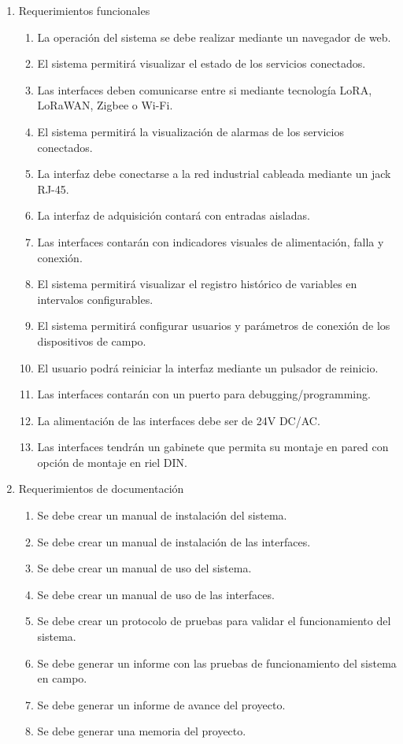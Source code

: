 \documentclass[
11pt%
]{charter}
\begin{document}
\begin{enumerate}
	\item Requerimientos funcionales
		\begin{enumerate}
			\item La operación del sistema se debe realizar mediante un navegador de web.
			\item El sistema permitirá visualizar el estado de los servicios conectados.
			\item Las interfaces deben comunicarse entre si mediante tecnología LoRA, LoRaWAN, Zigbee o Wi-Fi.
			\item El sistema permitirá la visualización de alarmas de los servicios conectados.
			\item La interfaz debe conectarse a la red industrial cableada mediante un jack RJ-45.
			\item La interfaz de adquisición contará con entradas aisladas.
			\item Las interfaces contarán con indicadores visuales de alimentación, falla y conexión.
			\item El sistema permitirá visualizar el registro histórico de variables en intervalos configurables. 
			\item El sistema permitirá configurar usuarios y parámetros de conexión de los dispositivos de campo.
			\item El usuario podrá reiniciar la interfaz mediante un pulsador de reinicio.
		    \item Las interfaces contarán con un puerto para debugging/programming.
		    \item La alimentación de las interfaces debe ser de 24V DC/AC.
		    \item Las interfaces tendrán un gabinete que permita su montaje en pared con opción de montaje en riel DIN.
		\end{enumerate}

	\item Requerimientos de documentación
		\begin{enumerate}
			\item Se debe crear un manual de instalación del sistema.
			\item Se debe crear un manual de instalación de las interfaces.
			\item Se debe crear un manual de uso del sistema.
			\item Se debe crear un manual de uso de las interfaces.
			\item Se debe crear un protocolo de pruebas para validar el funcionamiento del sistema.
			\item Se debe generar un informe con las pruebas de funcionamiento del sistema en campo.
			\item Se debe generar un informe de avance del proyecto.
			\item Se debe generar una memoria del proyecto.


\end{enumerate}
\end{enumerate}
\end{document}
